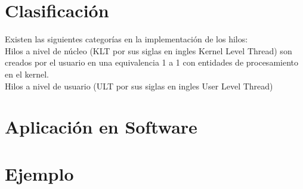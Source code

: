 \documentclass[]{article}
\begin{document}
\begin{multicols}{2}
		\section{Clasificación}
		Existen las siguientes categorías en la implementación de los hilos:\\
		Hilos a nivel de núcleo (KLT por sus siglas en ingles Kernel Level Thread) son creados por el usuario en una equivalencia 1 a 1 con entidades de procesamiento en el kernel\cite{wiki}.\\
		Hilos a nivel de usuario (ULT por sus siglas en ingles User Level Thread) 
		\section{Aplicación en Software}
		
		\section{Ejemplo}
		
		\printbibliography
	\end{multicols}
	
\end{document}
